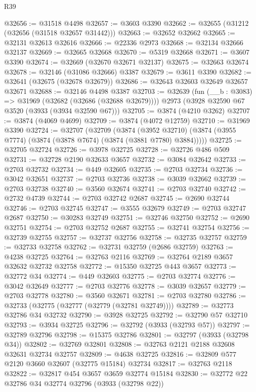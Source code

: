 \begin{lexlean}{R39}
\begin{coremodule}
@32656 := @31518 @4498
@32657 := @3603 @3390
@32662 := @32655 (@31212 (@32656 (@31518 @32657 @31442)))
@32663 := @32652 @32662
@32665 := @32131 @32613 @32616
@32666 := @22336 @2973
@32668 := @32134 @32666 @32137
@32669 := @32665 @32668
@32670 := @5319 @32668
@32671 := @3607 @3390
@32674 := @32669 (@32670 @32671 @32137)
@32675 := @32663 @32674
@32678 := @32146 (@31086 @32666) @3387
@32679 := @3611 @3390
@32682 := @32641 (@32675 (@32678 @32679))
@32686 := @32643 @32603 @32649 @32657 @32671
@32688 := @32146 @4498 @3387
@32703 := @32639
    (fun (__b : @3083) => @31969 (@32682 (@32686 (@32688 @32679))))
    @2973
    (@3928 @32590 @67 @3520 (@3933 (@3934 @32590 @67)))
@32705 := @3874 (@4210 @3262)
@32707 := @3874 (@4069 @4699)
@32709 := @3874 (@4072 @12759)
@32710 := @31969 @3390
@32724 := @32707
    (@32709
      (@3874
        (@3952 @32710)
        (@3874 (@3955 @7774) (@3874 (@3878 @7674) (@3874 (@3881 @7780) @3884)))))
@32725 := @32705 @32724
@32726 := @3978 @32725
@32728 := @32726 @486 @509
@32731 := @32728 @2190 @32633 @3657
@32732 := @3084 @32642
@32733 := @2703 @32732
@32734 := @449 @32605
@32735 := @2703 @32734
@32736 := @3042 @32651
@32737 := @2703 @32736
@32738 := @3039 @32662
@32739 := @2703 @32738
@32740 := @3560 @32674
@32741 := @2703 @32740
@32742 := @2732 @4739
@32744 := @2703 @32742 @2687
@32745 := @2690 @32744
@32746 := @2703 @32745
@32747 := @3555 @32679
@32749 := @2703 @32747 @2687
@32750 := @30283 @32749
@32751 := @32746 @32750
@32752 := @2690 @32751
@32754 := @2703 @32752 @2687
@32755 := @32741 @32754
@32756 := @32739 @32755
@32757 := @32737 @32756
@32758 := @32735 @32757
@32759 := @32733 @32758
@32762 := @32731 @32759 (@2686 @32759)
@32763 := @4238 @32725
@32764 := @32763 @2116
@32769 := @32764 @2189 @3657 @32632 @32732 @32758
@32772 := @15350 @32725 @443 @3657
@32773 := @32772 @34
@32774 := @449 @32603
@32775 := @2703 @32774
@32776 := @3042 @32649
@32777 := @2703 @32776
@32778 := @3039 @32657
@32779 := @2703 @32778
@32780 := @3560 @32671
@32781 := @2703 @32780
@32786 := @32733 (@32775 (@32777 (@32779 (@32781 @32749))))
@32789 := @32773 @32786 @34 @32732
@32790 := @3928 @32725
@32792 := @32790 @57 @32710
@32793 := @3934 @32725
@32796 := @32792 (@3933 (@32793 @57))
@32797 := @32789 @32796
@32798 := @15375 @32786
@32801 := @32797 (@3933 (@32798 @34))
@32802 := @32769 @32801
@32808 := @32763 @2121 @2188 @32608 @32631 @32734 @32757
@32809 := @4638 @32725
@32816 := @32809 @577 @2120 @3660 @32607 (@32775 @15184) @32734
@32817 := @32763 @2118
@32822 := @32817 @454 @3657 @3659 @32774 @15184
@32830 := @32772 @22 @32786 @34 @32774 @32796 (@3933 (@32798 @22))

\end{coremodule}
\end{lexlean}
